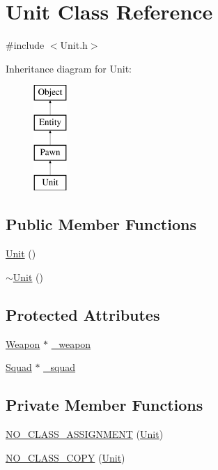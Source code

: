 \section{Unit Class Reference}
\label{class_unit}


{\ttfamily \#include $<$Unit.\-h$>$}

Inheritance diagram for Unit\-:\begin{figure}[H]
\begin{center}
\leavevmode
\includegraphics[height=4.000000cm]{class_unit}
\end{center}
\end{figure}
\subsection*{Public Member Functions}
\begin{DoxyCompactItemize}
\item 
\hyperlink{class_unit_a8e46f663a95736c8002d85ab271a7581}{Unit} ()
\item 
\hyperlink{class_unit_a6353fc4c0a329997ad4abcf0dcb4eb27}{$\sim$\-Unit} ()
\end{DoxyCompactItemize}
\subsection*{Protected Attributes}
\begin{DoxyCompactItemize}
\item 
\hyperlink{class_weapon}{Weapon} $\ast$ \hyperlink{class_unit_ae2fd9770344d1c6b665ec17539afb8af}{\-\_\-weapon}
\item 
\hyperlink{class_squad}{Squad} $\ast$ \hyperlink{class_unit_a48c0b8476206f1570feff78583ad78bb}{\-\_\-squad}
\end{DoxyCompactItemize}
\subsection*{Private Member Functions}
\begin{DoxyCompactItemize}
\item 
\hyperlink{class_unit_a8e68d37b2f430063be9ab6019b7f87c3}{N\-O\-\_\-\-C\-L\-A\-S\-S\-\_\-\-A\-S\-S\-I\-G\-N\-M\-E\-N\-T} (\hyperlink{class_unit}{Unit})
\item 
\hyperlink{class_unit_a3a1c85d96c21e21f2fa720efd28afec8}{N\-O\-\_\-\-C\-L\-A\-S\-S\-\_\-\-C\-O\-P\-Y} (\hyperlink{class_unit}{Unit})
\end{DoxyCompactItemize}
